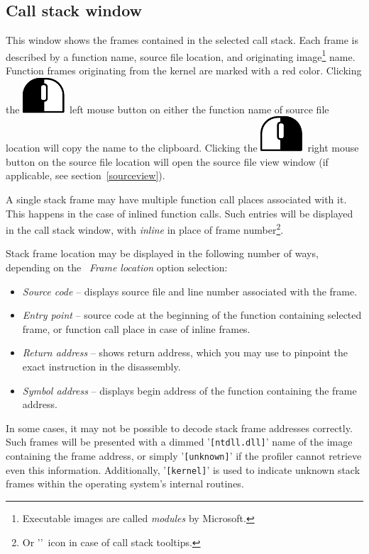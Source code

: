 \documentclass[hidelinks,titlepage,a4paper]{article}
\newcommand{\LMB}{\includegraphics[height=.8\baselineskip]{icons/lmb}}
\newcommand{\RMB}{\includegraphics[height=.8\baselineskip]{icons/rmb}}
\begin{document}
\subsection{Call stack window}
\label{callstackwindow}

This window shows the frames contained in the selected call stack. Each frame is described by a function name, source file location, and originating image\footnote{Executable images are called \emph{modules} by Microsoft.} name. Function frames originating from the kernel are marked with a red color. Clicking the \LMB{}~left mouse button on either the function name of source file location will copy the name to the clipboard. Clicking the \RMB{}~right mouse button on the source file location will open the source file view window (if applicable, see section~\ref{sourceview}).

A single stack frame may have multiple function call places associated with it. This happens in the case of inlined function calls. Such entries will be displayed in the call stack window, with \emph{inline} in place of frame number\footnote{Or '\faCaretRight{}'~icon in case of call stack tooltips.}.

Stack frame location may be displayed in the following number of ways, depending on the \emph{\faAt{}~Frame location} option selection:

\begin{itemize}
\item \emph{Source code} -- displays source file and line number associated with the frame.
\item \emph{Entry point} -- source code at the beginning of the function containing selected frame, or function call place in case of inline frames.
\item \emph{Return address} -- shows return address, which you may use to pinpoint the exact instruction in the disassembly.
\item \emph{Symbol address} -- displays begin address of the function containing the frame address.
\end{itemize}

In some cases, it may not be possible to decode stack frame addresses correctly. Such frames will be presented with a dimmed '\texttt{[ntdll.dll]}' name of the image containing the frame address, or simply '\texttt{[unknown]}' if the profiler cannot retrieve even this information. Additionally, '\texttt{[kernel]}' is used to indicate unknown stack frames within the operating system's internal routines.
\end{document}
